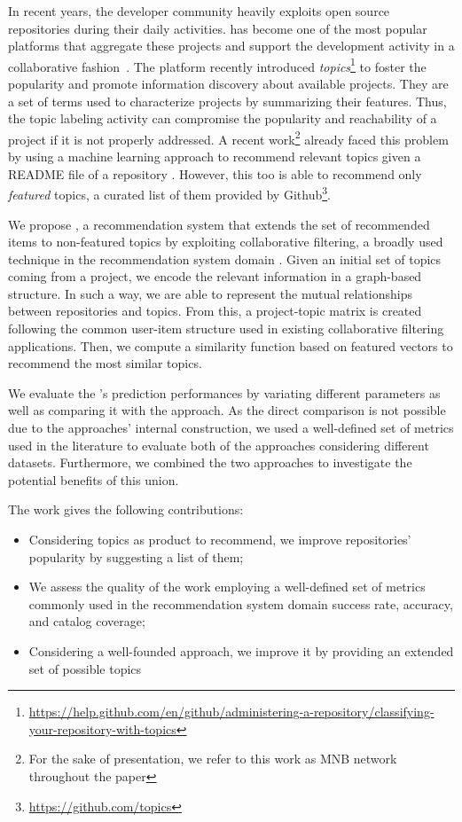 In recent years, the developer community heavily exploits open source repositories during their daily activities. \GH has become one of the most
popular platforms that aggregate these projects and
support the development activity in a collaborative fashion~\cite{7832894}.
%
The platform recently introduced \emph{topics}\footnote{\url{https://help.github.com/en/github/administering-a-repository/classifying-your-repository-with-topics}} to foster the popularity and promote information discovery about available projects. They are a set of terms used to characterize projects by summarizing their features.  
Thus, the topic labeling activity can compromise the popularity and reachability of a project if it is not properly addressed. A recent work\footnote{For the sake of presentation, we refer to this work as MNB network throughout the paper} already faced this problem by using a machine learning approach to recommend relevant topics given a README file of a repository \cite{10.1145/3383219.3383227}. However, this too is able to recommend only \emph{featured} topics, a curated list of them provided by Github\footnote{\url{https://github.com/topics}}.
 
We propose \CT, a recommendation system that extends the set of recommended items to non-featured topics by exploiting collaborative filtering, a broadly used technique in the recommendation system domain \cite{Schafer:2007:CFR:1768197.1768208}. Given an initial set of topics coming from a \GH project, we encode the relevant information in a graph-based structure. In such a way, we are able to represent the mutual relationships between repositories and topics. From this, a project-topic matrix is created following the common user-item structure used in existing collaborative filtering applications. Then, we compute a similarity function based on featured vectors to recommend the most similar topics.

We evaluate the \CT's prediction performances by variating different parameters as well as comparing it with the \MNB approach. As the direct comparison is not possible due to the approaches' internal construction, we used a well-defined set of metrics used in the literature to evaluate both of the approaches considering different datasets. Furthermore, we combined the two approaches to investigate the potential benefits of this union. 

The work gives the following contributions:
\begin{itemize}
\item Considering \GH topics as product to recommend, we improve repositories' popularity by suggesting a list of them;
\item We assess the quality of the work employing a well-defined set of metrics commonly used in the recommendation system domain \ie success rate, accuracy, and catalog coverage;
\item Considering a well-founded approach, we improve it by providing an extended set of possible topics  
\end{itemize}

